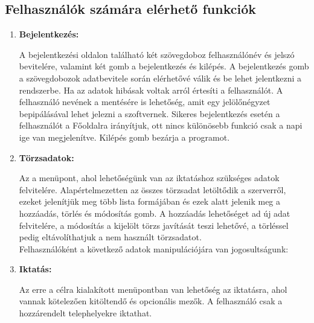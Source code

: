 \documentclass[
]{thesis-ekf}
\theoremstyle{definition}
\theoremstyle{remark}
\begin{document}
\subsection{Felhasználók számára elérhető funkciók}
\begin{enumerate}[leftmargin=0pt]
	\item \textbf{Bejelentkezés:}
	
A bejelentkezési oldalon található két szövegdoboz felhasználónév és jelszó bevitelére, valamint két gomb a bejelentkezés és kilépés. A bejelentkezés gomb a szövegdobozok adatbevitele során elérhetővé válik és be lehet jelentkezni a rendszerbe. Ha az adatok hibásak voltak arról értesíti a felhasználót. A felhasználó nevének a mentésére is lehetőség, amit egy jelölőnégyzet bepipálásával lehet jelezni a szoftvernek. Sikeres bejelentkezés esetén a felhasználót a Főoldalra irányítjuk, ott nincs különösebb funkció csak a napi ige van megjelenítve. Kilépés gomb bezárja a programot.	
	
	\item \textbf{Törzsadatok:}
	
Az a menüpont, ahol lehetőségünk van az iktatáshoz szükséges adatok felvitelére. Alapértelmezetten az összes törzsadat letöltődik a szerverről, ezeket jelenítjük meg több lista formájában és ezek alatt jelenik meg a hozzáadás, törlés és módosítás gomb. A hozzáadás lehetőséget ad új adat felvitelére, a módosítás a kijelölt törzs javítását teszi lehetővé, a törléssel pedig eltávolíthatjuk a nem használt törzsadatot. \\Felhasználóként a következő adatok manipulációjára van jogosultságunk: 

	\item \textbf{Iktatás:}

Az erre a célra kialakított menüpontban van lehetőség az iktatásra, ahol vannak kötelezően kitöltendő és opcionális mezők. A felhasználó csak a hozzárendelt telephelyekre iktathat.


\end{enumerate}
\end{document}
